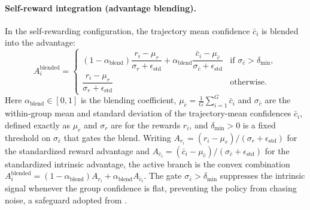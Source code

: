 \documentclass[a4paper,oneside,10pt,english]{scrbook}
\begin{document}
\paragraph{Self-reward integration (advantage blending).}
In the self-rewarding configuration, the trajectory mean confidence $\bar{c}_i$ is blended into the advantage:
\begin{equation}
	A_i^{\mathrm{blended}} =
	\begin{cases}
		(1 - \alpha_{\mathrm{blend}})\dfrac{r_i - \mu_r}{\sigma_r + \epsilon_{\mathrm{std}}} + \alpha_{\mathrm{blend}}\dfrac{\bar{c}_i - \mu_{\bar c}}{\sigma_{\bar c} + \epsilon_{\mathrm{std}}} & \text{if }\sigma_{\bar c} > \delta_{\min}, \\[10pt]
		\dfrac{r_i - \mu_r}{\sigma_r + \epsilon_{\mathrm{std}}}                                                                                                                                   & \text{otherwise}.
	\end{cases}
\end{equation}
Here $\alpha_{\mathrm{blend}} \in [0,1]$ is the blending coefficient, $\mu_{\bar c} = \tfrac{1}{G}\sum_{i=1}^G \bar{c}_i$ and $\sigma_{\bar c}$ are the within-group mean and standard deviation of the trajectory-mean confidences $\bar{c}_i$, defined exactly as $\mu_r$ and $\sigma_r$ are for the rewards $r_i$, and $\delta_{\min} > 0$ is a fixed threshold on $\sigma_{\bar c}$ that gates the blend. Writing $A_{r_i} = (r_i - \mu_r)/(\sigma_r + \epsilon_{\mathrm{std}})$ for the standardized reward advantage and $A_{\bar c_i} = (\bar{c}_i - \mu_{\bar c})/(\sigma_{\bar c} + \epsilon_{\mathrm{std}})$ for the standardized intrinsic advantage, the active branch is the convex combination $A_i^{\mathrm{blended}} = (1-\alpha_{\mathrm{blend}}) A_{r_i} + \alpha_{\mathrm{blend}} A_{\bar c_i}$. The gate $\sigma_{\bar c} > \delta_{\min}$ suppresses the intrinsic signal whenever the group confidence is flat, preventing the policy from chasing noise, a safeguard adopted from \citet{laser}.
\end{document}
